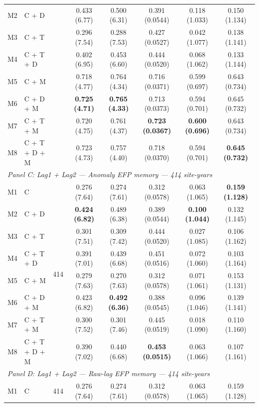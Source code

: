 \begin{table}[htbp]
\begin{tabular}{llcccccc}
M2 & C + D &  & 0.433 (6.77) & 0.500 (6.31) & 0.391 (0.0544) & 0.118 (1.033) & 0.150 (1.134) \\
M3 & C + T &  & 0.296 (7.54) & 0.288 (7.53) & 0.427 (0.0527) & 0.042 (1.077) & 0.138 (1.141) \\
M4 & C + T + D &  & 0.402 (6.95) & 0.453 (6.60) & 0.444 (0.0520) & 0.068 (1.062) & 0.133 (1.144) \\
M5 & C + M &  & 0.718 (4.77) & 0.764 (4.34) & 0.716 (0.0371) & 0.599 (0.697) & 0.643 (0.734) \\
M6 & C + D + M &  & \textbf{0.725 (4.71)} & \textbf{0.765 (4.33)} & 0.713 (0.0373) & 0.594 (0.701) & 0.645 (0.732) \\
M7 & C + T + M &  & 0.720 (4.75) & 0.761 (4.37) & \textbf{0.723 (0.0367)} & \textbf{0.600 (0.696)} & 0.643 (0.734) \\
M8 & C + T + D + M &  & 0.723 (4.73) & 0.757 (4.40) & 0.718 (0.0370) & 0.594 (0.701) & \textbf{0.645 (0.732)} \\
\midrule
\multicolumn{8}{l}{\textit{Panel C: Lag1 + Lag2 --- Anomaly EFP memory --- 414 site-years}} \\
\midrule
M1 & C & \multirow{8}{*}{414} & 0.276 (7.64) & 0.274 (7.61) & 0.312 (0.0578) & 0.063 (1.065) & \textbf{0.159 (1.128)} \\
M2 & C + D &  & \textbf{0.424 (6.82)} & 0.489 (6.38) & 0.389 (0.0544) & \textbf{0.100 (1.044)} & 0.132 (1.145) \\
M3 & C + T &  & 0.301 (7.51) & 0.309 (7.42) & 0.444 (0.0520) & 0.027 (1.085) & 0.106 (1.162) \\
M4 & C + T + D &  & 0.391 (7.01) & 0.439 (6.68) & 0.451 (0.0516) & 0.072 (1.060) & 0.103 (1.164) \\
M5 & C + M &  & 0.279 (7.63) & 0.270 (7.63) & 0.312 (0.0578) & 0.071 (1.061) & 0.153 (1.131) \\
M6 & C + D + M &  & 0.423 (6.82) & \textbf{0.492 (6.36)} & 0.388 (0.0545) & 0.096 (1.046) & 0.139 (1.141) \\
M7 & C + T + M &  & 0.300 (7.52) & 0.301 (7.46) & 0.445 (0.0519) & 0.018 (1.090) & 0.110 (1.160) \\
M8 & C + T + D + M &  & 0.390 (7.02) & 0.440 (6.68) & \textbf{0.453 (0.0515)} & 0.063 (1.066) & 0.107 (1.161) \\
\midrule
\multicolumn{8}{l}{\textit{Panel D: Lag1 + Lag2 --- Raw-lag EFP memory --- 414 site-years}} \\
\midrule
M1 & C & \multirow{8}{*}{414} & 0.276 (7.64) & 0.274 (7.61) & 0.312 (0.0578) & 0.063 (1.065) & 0.159 (1.128) \\

\end{tabular}
\end{table}
